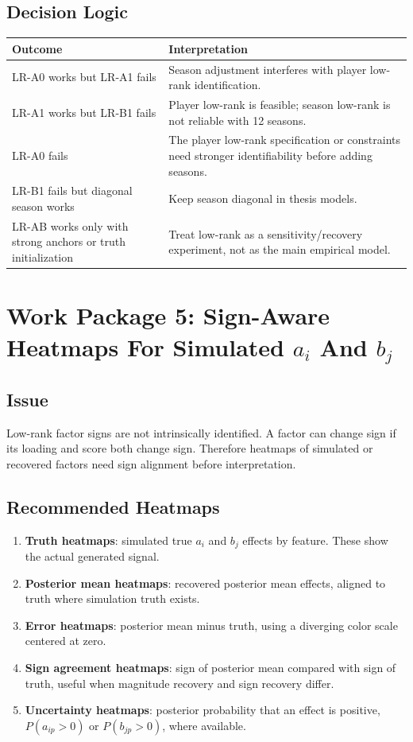 \documentclass[11pt]{article}
\begin{document}
\subsection{Decision Logic}

\begin{longtable}{L{0.36\textwidth}L{0.54\textwidth}}
\toprule
Outcome & Interpretation \\
\midrule
\endhead
LR-A0 works but LR-A1 fails & Season adjustment interferes with player
low-rank identification. \\
LR-A1 works but LR-B1 fails & Player low-rank is feasible; season low-rank is
not reliable with 12 seasons. \\
LR-A0 fails & The player low-rank specification or constraints need stronger
identifiability before adding seasons. \\
LR-B1 fails but diagonal season works & Keep season diagonal in thesis models. \\
LR-AB works only with strong anchors or truth initialization & Treat low-rank
as a sensitivity/recovery experiment, not as the main empirical model. \\
\bottomrule
\end{longtable}

\section{Work Package 5: Sign-Aware Heatmaps For Simulated \texorpdfstring{\(a_i\) And \(b_j\)}{a i And b j}}

\subsection{Issue}

Low-rank factor signs are not intrinsically identified. A factor can change
sign if its loading and score both change sign. Therefore heatmaps of simulated
or recovered factors need sign alignment before interpretation.

\subsection{Recommended Heatmaps}

\begin{enumerate}[leftmargin=*]
  \item \textbf{Truth heatmaps}: simulated true \(a_i\) and \(b_j\) effects by
  feature. These show the actual generated signal.
  \item \textbf{Posterior mean heatmaps}: recovered posterior mean effects,
  aligned to truth where simulation truth exists.
  \item \textbf{Error heatmaps}: posterior mean minus truth, using a diverging
  color scale centered at zero.
  \item \textbf{Sign agreement heatmaps}: sign of posterior mean compared with
  sign of truth, useful when magnitude recovery and sign recovery differ.
  \item \textbf{Uncertainty heatmaps}: posterior probability that an effect is
  positive, \(P(a_{ip} > 0)\) or \(P(b_{jp} > 0)\), where available.
\end{enumerate}
\end{document}
